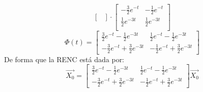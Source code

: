 \begin{enumerate}
\begin{equation}
\begin{bmatrix}
\end{bmatrix}
\cdot
\begin{bmatrix}
-\frac{3}{2}e^{-t} & -\frac{1}{2}e^{-t} \\
\frac{1}{2}e^{-3t} & \frac{1}{2}e^{-3t} \\
\end{bmatrix}
\end{equation}
\begin{equation}
    \Phi(t) =
    \begin{bmatrix}
    \frac{3}{2}e^{-t} - \frac{1}{2}e^{-3t} & \frac{1}{2}e^{-t} - \frac{1}{2}e^{-3t} \\
    -\frac{3}{2}e^{-t} + \frac{3}{2}e^{-3t} & -\frac{1}{2}e^{-t} + \frac{3}{2}e^{-3t}
    \end{bmatrix}
\end{equation}
De forma que la RENC está dada por:
\begin{equation}
    \Vec{X_0} = \begin{bmatrix}
    \frac{3}{2}e^{-t} - \frac{1}{2}e^{-3t} & \frac{1}{2}e^{-t} - \frac{1}{2}e^{-3t} \\
    -\frac{3}{2}e^{-t} + \frac{3}{2}e^{-3t} & -\frac{1}{2}e^{-t} + \frac{3}{2}e^{-3t}
    \end{bmatrix} \Vec{X_0}
\end{equation}
\end{enumerate}